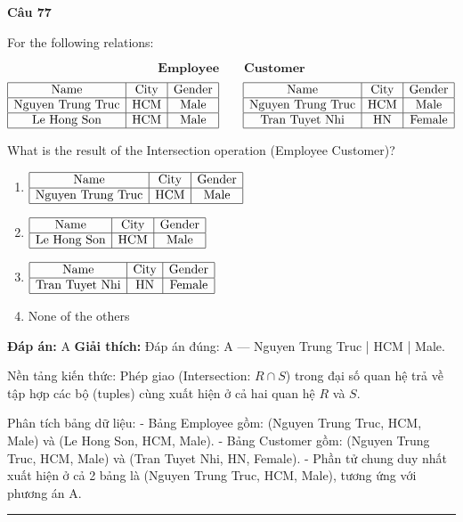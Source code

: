 \documentclass[11pt,a4paper]{article}
\newenvironment{question}[1]{%
  \par\vspace{1em}\noindent\textbf{\large Câu #1}\par\vspace{0.4em}
}{%
  \par\vspace{1em}\hrule\vspace{0.6em}
}
\newenvironment{choices}{%
  \begin{enumerate}[label=\textbf{\Alph*.},leftmargin=2.2em,itemsep=2pt,topsep=3pt]
}{%
  \end{enumerate}
}
\newcommand{\choice}{\item}
\begin{document}
\begin{question}{77}
For the following relations:

\[\textbf{Employee} \qquad \textbf{Customer}\]
\[\begin{array}{|c|c|c|}
\hline
\text{Name} & \text{City} & \text{Gender} \\
\hline
\text{Nguyen Trung Truc} & \text{HCM} & \text{Male} \\
\hline
\text{Le Hong Son} & \text{HCM} & \text{Male} \\
\hline
\end{array}
\qquad
\begin{array}{|c|c|c|}
\hline
\text{Name} & \text{City} & \text{Gender} \\
\hline
\text{Nguyen Trung Truc} & \text{HCM} & \text{Male} \\
\hline
\text{Tran Tuyet Nhi} & \text{HN} & \text{Female} \\
\hline
\end{array}\]

What is the result of the Intersection operation (Employee \cap Customer)?
\begin{choices}
\choice $\begin{array}{|c|c|c|}\hline \text{Name} & \text{City} & \text{Gender} \\\hline \text{Nguyen Trung Truc} & \text{HCM} & \text{Male} \\\hline\end{array}$
\choice $\begin{array}{|c|c|c|}\hline \text{Name} & \text{City} & \text{Gender} \\\hline \text{Le Hong Son} & \text{HCM} & \text{Male} \\\hline\end{array}$
\choice $\begin{array}{|c|c|c|}\hline \text{Name} & \text{City} & \text{Gender} \\\hline \text{Tran Tuyet Nhi} & \text{HN} & \text{Female} \\\hline\end{array}$
\choice None of the others
\end{choices}
\textbf{Đáp án:} A
\textbf{Giải thích:} Đáp án đúng: A — Nguyen Trung Truc | HCM | Male.

Nền tảng kiến thức: Phép giao (Intersection: $R \cap S$) trong đại số quan hệ trả về tập hợp các bộ (tuples) cùng xuất hiện ở cả hai quan hệ $R$ và $S$.

Phân tích bảng dữ liệu:
- Bảng Employee gồm: (Nguyen Trung Truc, HCM, Male) và (Le Hong Son, HCM, Male).
- Bảng Customer gồm: (Nguyen Trung Truc, HCM, Male) và (Tran Tuyet Nhi, HN, Female).
- Phần tử chung duy nhất xuất hiện ở cả 2 bảng là (Nguyen Trung Truc, HCM, Male), tương ứng với phương án A.
\end{question}
\end{document}
